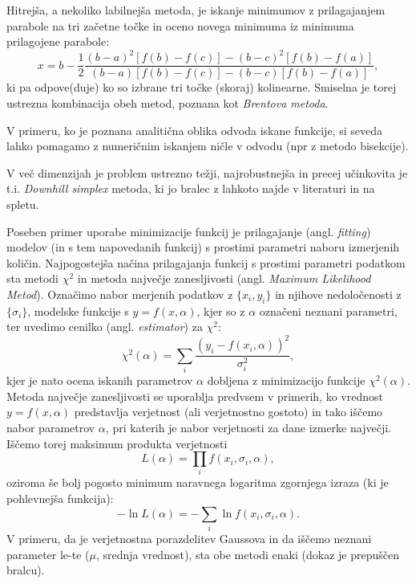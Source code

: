 \documentclass[12pt]{article}
\begin{document}
Hitrejša, a nekoliko labilnejša metoda, je iskanje minimumov z
prilagajanjem parabole na tri začetne točke in oceno novega
minimuma iz minimuma prilagojene parabole:
$$ x = b - \frac{1}{2} \frac{(b-a)^2 [ f(b)-f(c)]-(b-c)^2 [
    f(b)-f(a)]}{(b-a)[ f(b)-f(c)]-(b-c) [ f(b)-f(a)]},
$$
ki pa odpove(duje) ko so izbrane tri točke (skoraj)
kolinearne. Smiselna je torej ustrezna kombinacija obeh metod, poznana
kot \emph{Brentova metoda}.

V primeru, ko je poznana analitična oblika odvoda iskane funkcije,
si seveda lahko pomagamo z numeričnim iskanjem ničle v odvodu
(npr z metodo bisekcije).

V več dimenzijah je problem ustrezno težji, najrobustnejša in
precej učinkovita je t.i. \emph{Downhill simplex} metoda, ki jo
bralec z lahkoto najde v literaturi in na spletu.

Poseben primer uporabe minimizacije funkcij je prilagajanje (angl. \emph{fitting}) modelov (in s tem napovedanih funkcij) s prostimi parametri naboru izmerjenih količin.
Najpogostejša načina prilagajanja funkcij s prostimi parametri podatkom sta
metodi $\chi^2$ in metoda največje zanesljivosti (angl. \emph{Maximum Likelihood Metod}).
Označimo nabor merjenih podatkov z $\{ x_i,y_i \}$ in njihove nedoločenosti z $\{\sigma_i\}$,
modelske funkcije s $y=f(x,\alpha)$, kjer so z $\alpha$ označeni neznani parametri, ter uvedimo
cenilko (angl. \emph{estimator}) za $\chi^2$:
$$ \chi^2(\alpha) = \sum_i \frac{(y_i-f(x_i,\alpha))^2}{\sigma_i^2},$$
kjer je nato ocena iskanih parametrov $\alpha$ dobljena z minimizacijo funkcije $\chi^2(\alpha)$. \\
Metoda največje zanesljivosti se uporablja predvsem v primerih, ko vrednost $y=f(x,\alpha)$ predstavlja verjetnost (ali verjetnostno gostoto) in tako iščemo nabor parametrov $\alpha$, pri katerih je nabor verjetnosti za dane izmerke največji. Iščemo torej maksimum produkta verjetnosti
$$L(\alpha) = \prod_i f(x_i,\sigma_i,\alpha),$$
oziroma še bolj pogosto minimum naravnega logaritma zgornjega izraza (ki je pohlevnejša funkcija):
$$-\ln L(\alpha) = -\sum_i \ln f(x_i,\sigma_i,\alpha).$$
V primeru, da je verjetnostna porazdelitev Gaussova in da iščemo neznani parameter le-te ($\mu$, srednja vrednost), sta obe metodi enaki (dokaz je prepuščen bralcu).
\end{document}
